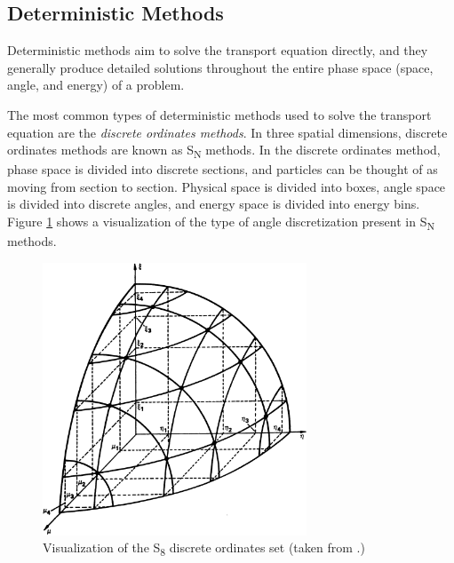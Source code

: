 \subsection{Deterministic Methods}
\label{sec:bg:rt:determ}

Deterministic methods aim to solve the transport equation directly, and they generally produce detailed solutions throughout the entire phase space (space, angle, and energy) of a problem.

The most common types of deterministic methods used to solve the transport equation are the \textit{discrete ordinates methods}.
In three spatial dimensions, discrete ordinates methods are known as S\textsubscript{N} methods.
In the discrete ordinates method, phase space is divided into discrete sections, and particles can be thought of as moving from section to section.
Physical space is divided into boxes, angle space is divided into discrete angles, and energy space is divided into energy bins.
Figure \ref{fig:bg:discrete-ordinates} shows a visualization of the type of angle discretization present in S\textsubscript{N} methods.

\begin{figure}[h!]
  \centering
  \includegraphics[width=0.7\textwidth]{content/background/discrete_ordinates.png}
  \caption{Visualization of the S\textsubscript{8} discrete ordinates set (taken from \cite{lewis_miller}.)}
  \label{fig:bg:discrete-ordinates}
\end{figure}

